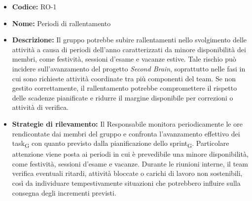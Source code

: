 ﻿\documentclass[a4paper, 10pt, colorlinks=true, linkcolor=black, urlcolor=blue, citecolor=blue, hidelinks]{article}
\begin{document}
\begin{itemize}
    \item \textbf{Codice:} RO-1

    \item \textbf{Nome:} Periodi di rallentamento

    \item \textbf{Descrizione:} Il gruppo potrebbe subire rallentamenti nello svolgimento delle attività a causa di periodi dell'anno caratterizzati da minore disponibilità dei membri, come festività, sessioni d'esame e vacanze estive. Tale rischio può incidere sull'avanzamento del progetto \textit{Second Brain}, soprattutto nelle fasi in cui sono richieste attività coordinate tra più componenti del team. Se non gestito correttamente, il rallentamento potrebbe compromettere il rispetto delle scadenze pianificate e ridurre il margine disponibile per correzioni o attività di verifica.

    \item \textbf{Strategie di rilevamento:} Il Responsabile monitora periodicamente le ore rendicontate dai membri del gruppo e confronta l'avanzamento effettivo dei task\textsubscript{G} con quanto previsto dalla pianificazione dello sprint\textsubscript{G}. Particolare attenzione viene posta ai periodi in cui è prevedibile una minore disponibilità, come festività, sessioni d'esame e vacanze. Durante le riunioni interne, il team verifica eventuali ritardi, attività bloccate o carichi di lavoro non sostenibili, così da individuare tempestivamente situazioni che potrebbero influire sulla consegna degli incrementi previsti.


\end{itemize}
\end{document}
